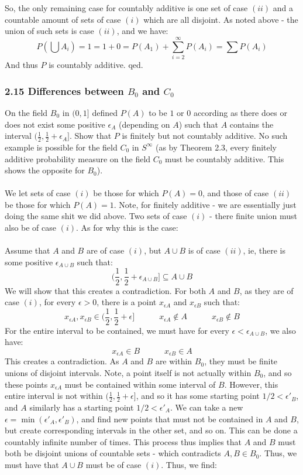 \documentclass[12pt,a4paper]{article}
\newcommand{\1}[1]{\mathbbm{1}\left\{ #1 \right\}}
\begin{document}
\\\\
So, the only remaining case for countably additive is one set of case $(ii)$ and a countable amount of sets of case $(i)$ which are all disjoint. As noted above - the union of such sets is case $(ii)$, and we have:
$$
	P\left(\bigcup A_i\right) = 1 = 1 + 0 = P(A_1) + \sum_{i=2}^\infty P\left(A_i\right) = \sum P(A_i)
$$
And thus $P$ is countably additive. qed.

\subsubsection{2.15 Differences between $B_0$ and $C_0$} On the field $B_0$ in $(0,1]$ defined $P(A)$ to be $1$ or $0$ according as there does or does not exist some positive $\epsilon_A$ (depending on $A$) such that $A$ contains the interval $\bigg(\frac{1}{2}, \frac{1}{2} + \epsilon_A\bigg]$. Show that $P$ is finitely but not countably additive. No such example is possible for the field $C_0$ in $S^\infty$ (as by Theorem 2.3, every finitely additive probability measure on the field $C_0$ must be countably additive. This shows the opposite for $B_0$).
\\\\
We let sets of case $(i)$ be those for which $P(A) = 0$, and those of case $(ii)$ be those for which $P(A) = 1$. Note, for finitely additive - we are essentially just doing the same shit we did above. Two sets of case $(i)$ - there finite union must also be of case $(i)$. As for why this is the case:
\\\\
Assume that $A$ and $B$ are of case $(i)$, but $A \cup B$ is of case $(ii)$, ie, there is some positive $\epsilon_{A \cup B}$ such that:
$$
	\bigg(\frac{1}{2}, \frac{1}{2} + \epsilon_{A \cup B}\bigg] \subseteq A \cup B
$$
We will show that this creates a contradiction. For both $A$ and $B$, as they are of case $(i)$, for every $\epsilon > 0$, there is a point $x_{\epsilon A}$ and $x_{\epsilon B}$ such that:
$$
	x_{\epsilon A}, x_{\epsilon B} \in \bigg(\frac{1}{2}, \frac{1}{2} + \epsilon\bigg] 
	\quad\quad\quad x_{\epsilon A} \not\in A
	\quad\quad\quad x_{\epsilon B} \not\in B
$$
For the entire interval to be contained, we must have for every $\epsilon < \epsilon_{A \cup B}$, we also have:
$$
	x_{\epsilon A} \in B
	\quad\quad\quad
	x_{\epsilon B} \in A
$$
This creates a contradiction. As $A$ and $B$ are within $B_0$, they must be finite unions of disjoint intervals. Note, a point itself is not actually within $B_0$, and so these points $x_{\epsilon A}$ must be contained within some interval of $B$. However, this entire interval is not within $\bigg(\frac{1}{2}, \frac{1}{2} + \epsilon\bigg]$, and so it has some starting point $1/2 < \epsilon'_B$, and $A$ similarly has a starting point $1/2 < \epsilon'_A$. We can take a new $\epsilon = \min(\epsilon'_A,\epsilon'_B)$, and find new points that must not be contained in $A$ and $B$, but create corresponding intervals in the other set, and so on. This can be done a countably infinite number of times. This process thus implies that $A$ and $B$ must both be disjoint unions of countable sets - which contradicts $A,B \in B_0$. Thus, we must have that $A \cup B$ must be of case $(i)$. Thus, we find:
\end{document}
